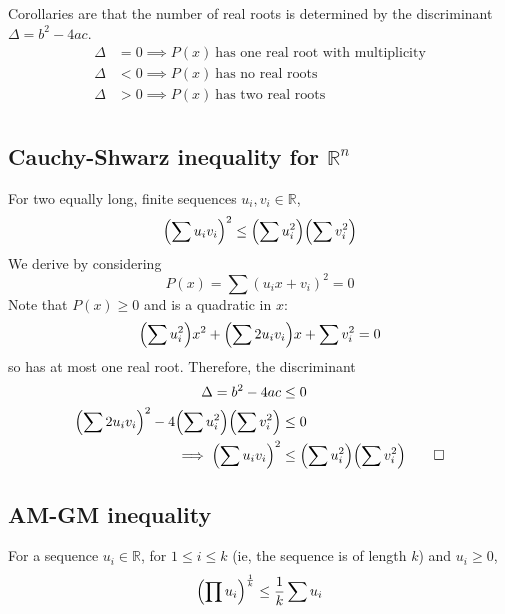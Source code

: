\documentclass[fleqn,a4paper,11pt]{article}
\begin{document}
    Corollaries are that the number of real roots is determined by the
    discriminant \(\Delta = b^2 - 4ac\).
    \begin{align}
    \Delta &= 0 \implies P(x)\ \text{has one real root with multiplicity} \\
    \Delta &< 0 \implies P(x)\ \text{has no real roots} \\
    \Delta &> 0 \implies P(x)\ \text{has two real roots} \\
    \end{align}

    \subsection{Cauchy-Shwarz inequality for \(\mathbb{R}^n\)}

    For two equally long, finite sequences \(u_i, v_i \in \mathbb{R}\),
    \begin{equation}
    \pqty{\sum u_i v_i}^2 \le \pqty{\sum u_i^2} \pqty{\sum v_i^2}
    \end{equation}
    We derive by considering
    \begin{equation*}
    P(x) = \sum (u_i x + v_i)^2 = 0
    \end{equation*}
    Note that \(P(x) \ge 0\) and is a quadratic in \(x\):
    \begin{equation*}
    \pqty{\sum u_i^2} x^2 + \pqty{\sum 2 u_i v_i} x + \sum v_i^2 = 0
    \end{equation*}
    so has at most one real root. Therefore, the discriminant
    \begin{align*}
    \Delta = b^2 - 4ac &\le 0 \\
    \pqty{\sum 2 u_i v_i}^2 - 4\pqty{\sum u_i^2}\pqty{\sum v_i^2} &\le 0
    \\\implies
    \pqty{\sum u_i v_i}^2 &\le \pqty{\sum u_i^2} \pqty{\sum v_i^2} \qed
    \end{align*}

    \subsection{AM-GM inequality}

    For a sequence \(u_i \in \mathbb{R}\), for \(1 \le i \le k\) (ie, the sequence
    is of length \(k\)) and \(u_i \ge 0\),
    \begin{equation}
    \pqty{\prod u_i}^\frac{1}{k} \le \frac{1}{k}\sum u_i
    \end{equation}
\end{document}
